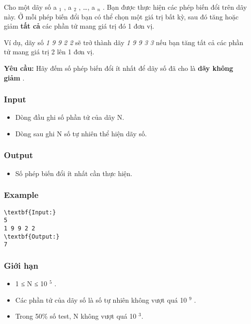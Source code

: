 

Cho một dãy số a $_ 1 $ , a $_ 2 $ , …, a $_ n $ . Bạn được thực hiện các phép biến đổi trên dãy này. Ở mỗi phép biến đổi bạn có thể chọn một giá trị bất kỳ, sau đó tăng hoặc giảm \textbf{ tất cả } các phần tử mang giá trị đó 1 đơn vị.

Ví dụ, dãy số \emph{ 1 9 9 2 2 } sẽ trở thành dãy \emph{ 1 9 9 3 3 } nếu bạn tăng tất cả các phần tử mang giá trị 2 lên 1 đơn vị.

\textbf{Yêu cầu: } Hãy đếm số phép biến đổi ít nhất để dãy số đã cho là \textbf{ dãy không giảm } .

\subsubsection{Input}
\begin{itemize}
	\item Dòng đầu ghi số phần tử của dãy N.
	\item Dòng sau ghi N số tự nhiên thể hiện dãy số.
\end{itemize}

\subsubsection{Output}
\begin{itemize}
	\item Số phép biến đổi ít nhất cần thực hiện.
\end{itemize}

\subsubsection{Example}
\begin{verbatim}
\textbf{Input:}
5
1 9 9 2 2
\textbf{Output:}
7\end{verbatim}

\subsubsection{Giới hạn}
\begin{itemize}
	\item 1 ≤ N ≤ 10 $^ 5 $ .
	\item Các phần tử của dãy số là số tự nhiên không vượt quá 10 $^ 9 $ .
	\item Trong 50\% số test, N không vượt quá 10 $^ 3$.
\end{itemize}